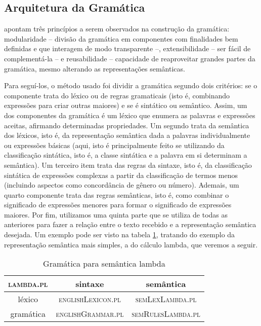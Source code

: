 \subsection{Arquitetura da Gramática} \label{sec:arquitetura}

	\citet[p.~86]{BlackburnBos:2005} apontam três princípios a serem observados na construção da gramática: modularidade -- divisão da gramática em componentes com finalidades bem definidas e que interagem de modo transparente --, extensibilidade -- ser fácil de complementá-la -- e reusabilidade -- capacidade de reaproveitar grandes partes da gramática, mesmo alterando as representações semânticas.
	
	Para seguí-los, o método usado foi dividir a gramática segundo dois critérios: se o componente trata do léxico ou de regras gramaticais (isto é, combinando expressões para criar outras maiores) e se é sintático ou semântico. Assim, um dos componentes da gramática é um léxico que enumera as palavras e expressões aceitas, afirmando determinadas propriedades. Um segundo trata da semântica dos léxicos, isto é, da representação semântica dada a palavras individualmente ou expressões básicas (aqui, isto é principalmente feito se utilizando da classificação sintática, isto é, a classe sintática e a palavra em si determinam a semântica). Um terceiro item trata das regras da sintaxe, isto é, da classificação sintática de expressões complexas a partir da classificação de termos menos (incluindo aspectos como concordância de gênero ou número). Ademais, um quarto componente trata das regras semânticas, isto é, como combinar o significado de expressões menores para formar o significado de expressões maiores. Por fim, utilizamos uma quinta parte que se utiliza de todas as anteriores para fazer a relação entre o texto recebido e a representação semântica desejada. Um exemplo pode ser visto na tabela \ref{curt-gramatica}, tratando do exemplo da representação semântica mais simples, a do cálculo lambda, que veremos a seguir.
	
	
	\begin{table}[h]
		\centering
		\begin{tabular}{|c|c|c|}
				\hline \textsc{lambda.pl} & sintaxe & semântica \\ 
				\hline léxico & \textsc{englishLexicon.pl} & \textsc{semLexLambda.pl} \\ 
				\hline gramática & \textsc{englishGrammar.pl} & \textsc{semRulesLambda.pl} \\ 
				\hline 
		\end{tabular}
		\caption{Gramática para semântica lambda}
		\label{curt-gramatica}
	\end{table}
		 
